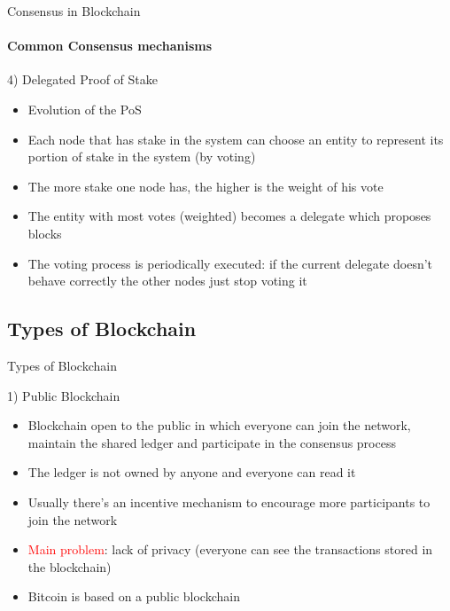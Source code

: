 \documentclass{beamer}
\newcommand\red[1]{\textcolor{red}{#1}}
\begin{document}
  \begin{frame}{Consensus in Blockchain}
    \framesubtitle{Common Consensus mechanisms}
    \begin{block}{4) Delegated Proof of Stake}
      \begin{itemize}
        \item Evolution of the PoS 
        \item Each node that has stake in the system can choose an entity to
        represent its portion of stake in the system (by voting) 
        \item The more stake one node has, the higher is the weight of his vote 
        \item The entity with most votes (weighted) becomes a delegate which
        proposes blocks 
        \item The voting process is periodically executed: if the current delegate
        doesn't behave correctly the other nodes just stop voting it
      \end{itemize}
    \end{block}
  \end{frame}



  \subsection{Types of Blockchain}
  \begin{frame}{Types of Blockchain}
    \begin{block}{1) Public Blockchain}
      \begin{itemize}
        \item Blockchain open to the public in which everyone can join the network,
        maintain the shared ledger and participate in the consensus process 
        \item The ledger is not owned by anyone and everyone can read it 
        \item Usually there's an incentive mechanism to encourage more participants
        to join the network \pause
        \item \red{Main problem}: lack of privacy (everyone can see the transactions
        stored in the blockchain) \pause
        \item Bitcoin is based on a public blockchain
      \end{itemize}
    \end{block}
  \end{frame}
\end{document}

